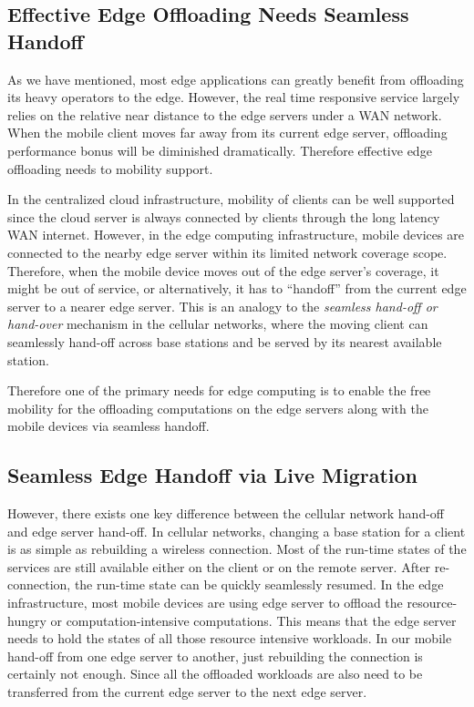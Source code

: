 \subsection{Effective Edge Offloading Needs Seamless Handoff}

As we have mentioned, most edge applications can greatly benefit from offloading its heavy operators to the edge. However, the real time responsive service largely relies on the relative near distance to the edge servers under a WAN network. When the mobile client moves far away from its current edge server, offloading performance bonus will be diminished dramatically.
Therefore effective edge offloading needs to mobility support.

In the centralized cloud infrastructure, mobility of clients can be well supported since the cloud server is always connected by clients through the long latency WAN internet. However, in the edge computing infrastructure, mobile devices are connected to the nearby edge server within its limited network coverage scope. Therefore, when the mobile device moves out of  the edge server's coverage, it might be out of service, or alternatively, it has to ``handoff'' from the current edge server to a nearer edge server. 
This is an analogy to the \textit{seamless hand-off or hand-over } mechanism in the cellular networks, where the moving client can seamlessly hand-off across base stations and be served by its nearest available station. 

Therefore one of the primary needs for edge computing is to enable the free mobility for the offloading computations on the edge servers along with the mobile devices via seamless handoff.


\subsection{Seamless Edge Handoff via Live Migration}

However, there exists one key difference between the cellular network hand-off and edge server hand-off.
%
In cellular networks, changing a base station for a client is as simple as rebuilding a wireless connection. Most of the run-time states of the services are still available either on the client or on the remote server. After re-connection, the run-time state can be quickly seamlessly resumed. 
%
In the edge infrastructure, most mobile devices are using edge server to offload the resource-hungry or computation-intensive computations. This means that the edge server needs to hold the states of all those resource intensive workloads. 
In our mobile hand-off from one edge server to another, just rebuilding the connection is certainly not enough. Since all the offloaded workloads are also need to be transferred from the current edge server to the next edge server.  

